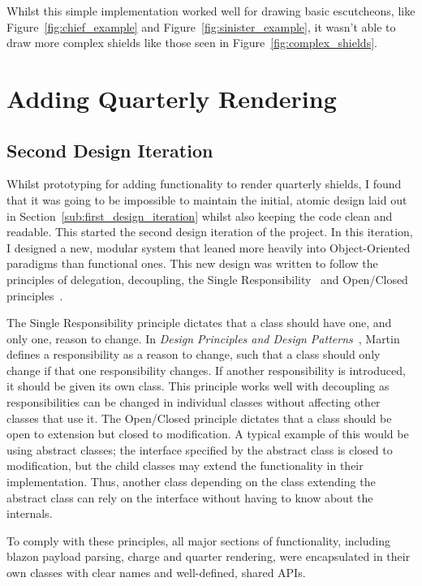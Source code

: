 \documentclass[nobib, a4paper, twoside, justified]{tufte-book}
\makeatletter
\newcommand{\charge}{\gls{charge}\@\xspace}
\newcommand{\quarter}{\gls{quarter}\@\xspace}
\newcommand{\blazon}{\gls{blazon}\@\xspace}
\newcommand{\payload}{\gls{payload}\@\xspace}
\makeatother
\begin{document}
Whilst this simple implementation worked well for drawing basic \glspl{escutcheon}, like
Figure~\ref{fig:chief_example} and Figure~\ref{fig:sinister_example}, it wasn't able to draw more
complex shields like those seen in Figure~\ref{fig:complex_shields}.

\section{Adding Quarterly Rendering}%
\label{sec:adding_quarterly_rendering}

\subsection{Second Design Iteration}%
\label{sub:second_design_iteration}

Whilst prototyping for adding functionality to render quarterly shields, I found that it was going
to be impossible to maintain the initial, atomic design laid out in
Section~\ref{sub:first_design_iteration} whilst also keeping the code clean and readable. This started the
second design iteration of the project. In this iteration, I designed a new, modular system that
leaned more heavily into Object-Oriented paradigms than functional ones. This new design was
written to follow the principles of delegation, decoupling, the Single
Responsibility~\autocite{martin2000design} and Open/Closed principles~\autocite{martin2000design}.

The Single Responsibility principle dictates that a class should have one, and only one, reason to
change. In \textit{Design Principles and Design Patterns}~\autocite{martin2000design}, Martin
defines a responsibility as a reason to change, such that a class should only change if that one
responsibility changes. If another responsibility is introduced, it should be given its own class.
This principle works well with decoupling as responsibilities can be changed in individual classes
without affecting other classes that use it. The Open/Closed principle dictates that a class should
be open to extension but closed to modification. A typical example of this would be using abstract
classes; the interface specified by the abstract class is closed to modification, but the child
classes may extend the functionality in their implementation. Thus, another class depending on the
class extending the abstract class can rely on the interface without having to know about the
internals.

To comply with these principles, all major sections of functionality, including \blazon
\payload parsing, \charge and \quarter rendering, were encapsulated in their own classes with clear
names and well-defined, shared APIs.
\end{document}

